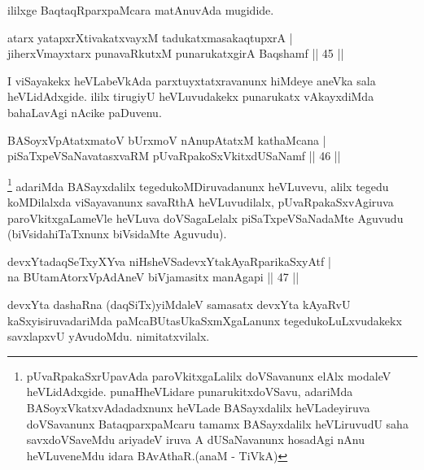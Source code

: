 \begin{center}
ililxge BaqtaqRparxpaMcara matAnuvAda mugidide.
\end{center}


\begin{shl}
atarx yatapxrXtivakatxvayxM tadukatxmasakaqtupxrA |\\
jiherxVmayxtarx punavaRkutxM punarukatxgirA Baqshamf \hfill || 45 ||
\end{shl}

\begin{artha}
I viSayakekx heVLabeVkAda parxtuyxtatxravanunx hiMdeye aneVka sala heVLidAdxgide. ililx 
tirugiyU heVLuvudakekx punarukatx vAkayxdiMda bahaLavAgi nAcike paDuvenu.
\end{artha}
	
\begin{shl}
BASoyxVpAtatxmatoV bUrxmoV nAnupAtatxM kathaMcana |\\
piSaTxpeVSaNavatasxvaRM pUvaRpakoSxVkitxdUSaNamf \hfill || 46 ||
\end{shl}

\begin{artha}
\footnote{pUvaRpakaSxrUpavAda paroVkitxgaLalilx doVSavanunx elAlx modaleV heVLidAdxgide. punaHheVLidare punarukitxdoVSavu, adariMda BASoyxVkatxvAdadadxnunx heVLade BASayxdalilx heVLadeyiruva doVSavanunx BataqparxpaMcaru tamamx BASayxdalilx heVLiruvudU saha savxdoVSaveMdu ariyadeV iruva A dUSaNavanunx hosadAgi nAnu heVLuveneMdu idara BAvAthaR.(anaM - TiVkA)} adariMda BASayxdalilx tegedukoMDiruvadanunx heVLuvevu, alilx tegedu koMDilalxda viSayavanunx savaRthA heVLuvudilalx, pUvaRpakaSxvAgiruva paroVkitxgaLameVle heVLuva doVSagaLelalx piSaTxpeVSaNadaMte Aguvudu (biVsidahiTaTxnunx biVsidaMte Aguvudu).
\end{artha}


\begin{shl}
devxYtadaqSeTxyXYva niHsheVSadevxYtakAyaRparikaSxyAtf |\\
na BUtamAtorxVpAdAneV biVjamasitx manAgapi \hfill || 47 ||
\end{shl}

\begin{artha}
devxYta dashaRna (daqSiTx)yiMdaleV samasatx devxYta kAyaRvU kaSxyisiruvadariMda paMcaBUtasUkaSxmXgaLanunx tegedukoLuLxvudakekx savxlapxvU yAvudoMdu. nimitatxvilalx.
\end{artha}

